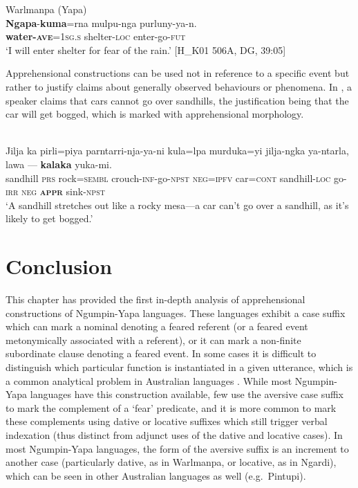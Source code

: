 \documentclass[output=paper,colorlinks,citecolor=brown]{langscibook}
\begin{document}
\ea 
\textnormal{Warlmanpa (Yapa)} \\
\gll \textbf{Ngapa}-\textbf{kuma}=rna mulpu-nga purluny-ya-n. \\
\textbf{water-\textsc{ave}}=\textsc{1sg.s} shelter-\textsc{loc} enter-go-\textsc{fut}  \\
\glt `I will enter shelter for fear of the rain.' [H\_K01 506A, DG, 39:05]
\label{ex:bro85}
\z

\largerpage
 Apprehensional constructions can be used not in reference to a specific event but rather to justify claims about generally observed behaviours or phenomena. In , a speaker claims that cars cannot go over sandhills, the justification being that the car will get bogged, which is marked with apprehensional morphology.

\ea
{} \\
\gll Jilja ka pirli=piya parntarri-nja-ya-ni kula=lpa  murduka=yi jilja-ngka ya-ntarla, lawa --- \textbf{kalaka} yuka-mi. \\
sandhill \textsc{prs} rock=\textsc{sembl} crouch-\textsc{inf}-go-\textsc{npst} \textsc{neg=ipfv} car=\textsc{cont} sandhill-\textsc{loc} go-\textsc{irr} \textsc{neg} \phantom{---} \textsc{\textbf{appr}} sink-\textsc{npst} \\
\glt `A sandhill stretches out like a rocky mesa---a car can't go over a sandhill, as it's likely to get bogged.'
\label{ex:bro86}
\z

\section{Conclusion}

This chapter has provided the first in-depth analysis of apprehensional constructions of Ngumpin-Yapa languages. These languages exhibit a case suffix which can mark a nominal denoting a feared referent (or a feared event metonymically associated with a referent), or it can mark a non-finite subordinate clause denoting a feared event. In some cases it is difficult to distinguish which particular function is instantiated in a given utterance, which is a common analytical problem in Australian languages \citep{hale_essential_1982}. While most Ngumpin-Yapa languages have this construction available, few use the aversive case suffix to mark the complement of a `fear' predicate, and it is more common to mark these complements using dative or locative suffixes which still trigger verbal indexation (thus distinct from adjunct uses of the dative and locative cases). In most Ngumpin-Yapa languages, the form of the aversive suffix is an increment to another case (particularly dative, as in Warlmanpa, or locative, as in Ngardi), which can be seen in other Australian languages as well (e.g.\  Pintupi).
\end{document}

